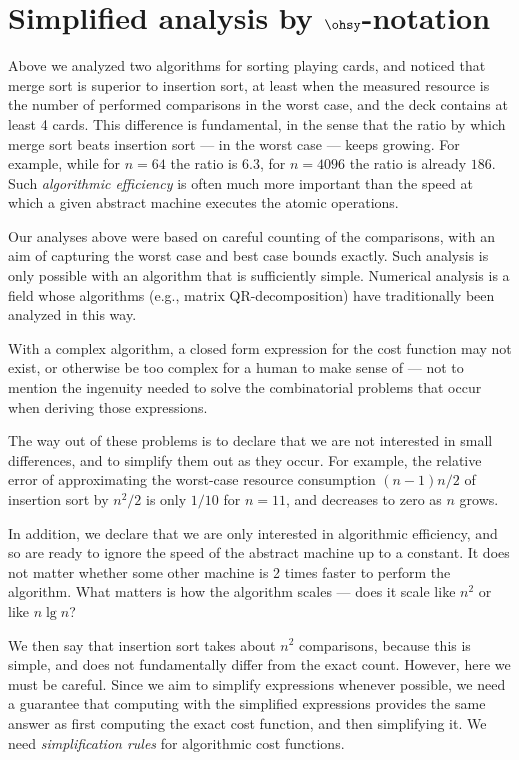\documentclass[b5paper, english, oneside]{memoir}
\begin{document}
\section{Simplified analysis by \texorpdfstring{$\ohsy$}{O}-notation}

Above we analyzed two algorithms for sorting playing cards, and noticed that merge sort is superior to insertion sort, at least when the measured resource is the number of performed comparisons in the worst case, and the deck contains at least 4 cards. This difference is fundamental, in the sense that the ratio by which merge sort beats insertion sort --- in the worst case --- keeps growing. For example, while for $n = 64$ the ratio is $6.3$, for $n = 4096$ the ratio is already $186$. Such \emph{algorithmic efficiency} is often much more important than the speed at which a given abstract machine executes the atomic operations.

Our analyses above were based on careful counting of the comparisons, with an aim of capturing the worst case and best case bounds exactly. Such analysis is only possible with an algorithm that is sufficiently simple. Numerical analysis is a field whose algorithms (e.g., matrix QR-decomposition) have traditionally been analyzed in this way.

With a complex algorithm, a closed form expression for the cost function may not exist, or otherwise be too complex for a human to make sense of --- not to mention the ingenuity needed to solve the combinatorial problems that occur when deriving those expressions. 

The way out of these problems is to declare that we are not interested in small differences, and to simplify them out as they occur. For example, the relative error of approximating the worst-case resource consumption $(n - 1)n / 2$ of insertion sort by $n^2 / 2$ is only $1/10$ for $n = 11$, and decreases to zero as $n$ grows. 

In addition, we declare that we are only interested in algorithmic efficiency, and so are ready to ignore the speed of the abstract machine up to a constant. It does not matter whether some other machine is 2 times faster to perform the algorithm. What matters is how the algorithm scales --- does it scale like $n^2$ or like $n \lg{n}$? 

We then say that insertion sort takes about $n^2$ comparisons, because this is simple, and does not fundamentally differ from the exact count. However, here we must be careful. Since we aim to simplify expressions whenever possible, we need a guarantee that computing with the simplified expressions provides the same answer as first computing the exact cost function, and then simplifying it. We need \emph{simplification rules} for algorithmic cost functions.
\end{document}
